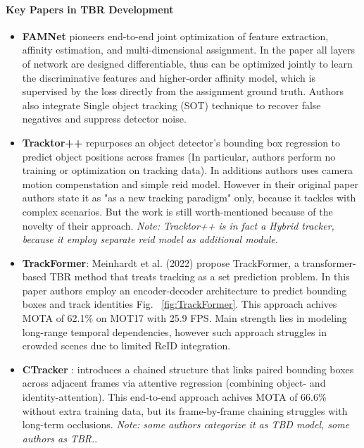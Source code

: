 \documentclass[12pt, a4paper]{article}
\begin{document}
\paragraph{Key Papers in TBR Development}
\begin{itemize}

    \item \textbf{FAMNet} \cite{FAMNet} pioneers end-to-end joint optimization of feature extraction, affinity estimation, and multi-dimensional assignment. In the paper all layers of network are designed differentiable, thus can be optimized jointly to learn the discriminative features and higher-order affinity model, which is supervised by the loss directly from the assignment ground truth. Authors also integrate Single object tracking (SOT) technique to recover false negatives and suppress detector noise.

    \item \textbf{Tracktor++} \cite{Tracktorpp} repurposes an object detector’s bounding box regression to predict object positions across frames (In particular, authors perform no training or optimization on tracking data). In additions authors uses camera motion compenstation and simple reid model. However in their original paper authors state it as "as a new tracking paradigm" only, because it tackles with complex scenarios. But the work is still worth-mentioned because of the novelty of their approach. \textit{Note: Tracktor++ is in fact a Hybrid tracker, because it employ separate reid model as additional module.}

    \item \textbf{TrackFormer}\cite{trackformer}: Meinhardt et al. (2022) propose TrackFormer, a transformer-based TBR method that treats tracking as a set prediction problem. In this paper authors employ an encoder-decoder architecture to predict bounding boxes and track identities Fig. ~\ref{fig:TrackFormer}. This approach achives MOTA of 62.1\% on MOT17 with 25.9 FPS. Main strength lies in modeling long-range temporal dependencies, however such approach struggles in crowded scenes due to limited ReID integration.

    \item \textbf{CTracker} \cite{CTracker}: introduces a chained structure that links paired bounding boxes across adjacent frames via attentive regression (combining object- and identity-attention). This end-to-end approach achives MOTA of 66.6\% without extra training data, but its frame-by-frame chaining struggles with long-term occlusions. \textit{Note: some authors categorize it as TBD model, some authors \cite{sota-trackets-survey} as TBR.}.


\end{itemize}
\end{document}
